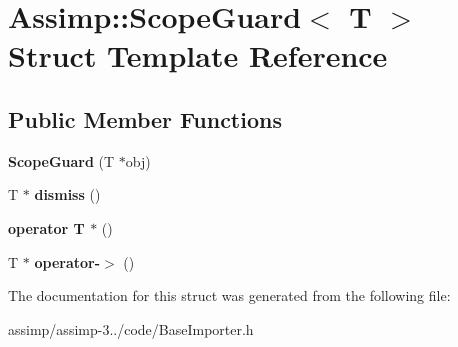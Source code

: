 \hypertarget{struct_assimp_1_1_scope_guard}{\section{Assimp\+:\+:Scope\+Guard$<$ T $>$ Struct Template Reference}
\label{struct_assimp_1_1_scope_guard}
}
\subsection*{Public Member Functions}
\begin{DoxyCompactItemize}
\item 
\hypertarget{struct_assimp_1_1_scope_guard_afcb31363d9480068993a5d026bf950ef}{{\bfseries Scope\+Guard} (T $\ast$obj)}\label{struct_assimp_1_1_scope_guard_afcb31363d9480068993a5d026bf950ef}

\item 
\hypertarget{struct_assimp_1_1_scope_guard_a182f6e6a54b0d29b5493dbc395846526}{T $\ast$ {\bfseries dismiss} ()}\label{struct_assimp_1_1_scope_guard_a182f6e6a54b0d29b5493dbc395846526}

\item 
\hypertarget{struct_assimp_1_1_scope_guard_acc2bc7353197ca0d6de05ddbcd667d1d}{{\bfseries operator T $\ast$} ()}\label{struct_assimp_1_1_scope_guard_acc2bc7353197ca0d6de05ddbcd667d1d}

\item 
\hypertarget{struct_assimp_1_1_scope_guard_a374325704ba55a1a85f391e3f67315a5}{T $\ast$ {\bfseries operator-\/$>$} ()}\label{struct_assimp_1_1_scope_guard_a374325704ba55a1a85f391e3f67315a5}

\end{DoxyCompactItemize}


The documentation for this struct was generated from the following file\+:\begin{DoxyCompactItemize}
\item 
assimp/assimp-\/3../code/Base\+Importer.\+h\end{DoxyCompactItemize}
